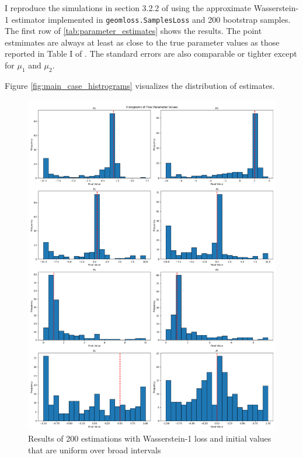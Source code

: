 I reproduce the simulations in section 3.2.2 of \textcite{kaji2023adversarial} using the approximate Wasserstein-1 estimator implemented in \texttt{geomloss.SamplesLoss} and 200 bootstrap samples.
The first row of \ref{tab:parameter_estimates} shows the results.
The point estmimates are always at least as close to the true parameter values as those reported in Table I of \cite{kaji2023adversarial}.
The standard errors are also comparable or tighter except for $\mu_1$ and $\mu_2$.

Figure \ref{fig:main_case_histrograms} visualizes the distribution of estimates.

\begin{figure}
    \includegraphics[width=\textwidth]{./Images/wide_uniform_histograms.png}
    \caption{Results of 200 estimations with Wasserstein-1 loss and initial values that are uniform over broad intervals}
    \label{fig:wide_uniform_histograms}
\end{figure}



